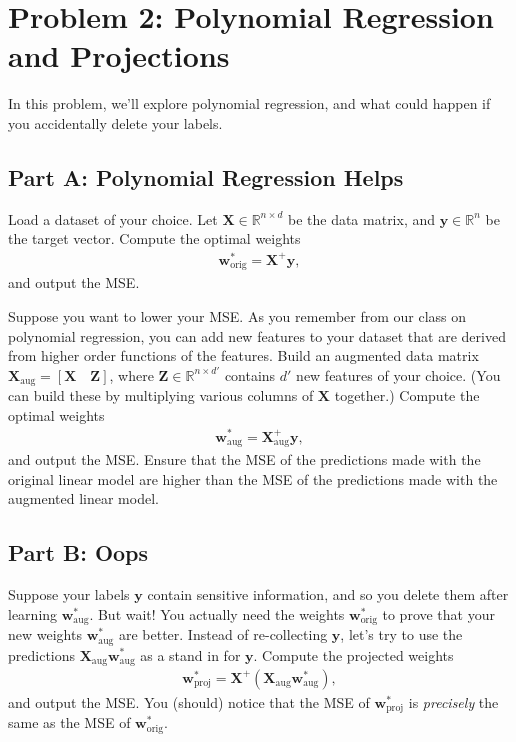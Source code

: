 \documentclass{article}
\begin{document}
%

\newpage
\section*{Problem 2: Polynomial Regression and Projections}

In this problem, we'll explore polynomial regression, and what could happen if you accidentally delete your labels.

\subsection*{Part A: Polynomial Regression Helps}

Load a dataset of your choice.
Let $\mathbf{X} \in \mathbb{R}^{n \times d}$ be the data matrix, and $\mathbf{y} \in \mathbb{R}^n$ be the target vector.
Compute the optimal weights 
\begin{align}
\mathbf{w}^*_\text{orig} = \mathbf{X}^+ \mathbf{y},
\end{align}
and output the MSE.

Suppose you want to lower your MSE.
As you remember from our class on polynomial regression, you can add new features to your dataset that are derived from higher order functions of the features.
Build an augmented data matrix $\mathbf{X}_\text{aug} = [\mathbf{X} \quad \mathbf{Z}]$, where $\mathbf{Z} \in \mathbb{R}^{n \times d'}$ contains $d'$ new features of your choice.
(You can build these by multiplying various columns of $\mathbf{X}$ together.)
Compute the optimal weights
\begin{align}
\mathbf{w}^*_\text{aug} = \mathbf{X}_\text{aug}^+ \mathbf{y},
\end{align}
and output the MSE.
Ensure that the MSE of the predictions made with the original linear model are higher than the MSE of the predictions made with the augmented linear model.

\subsection*{Part B: Oops}

Suppose your labels $\mathbf{y}$ contain sensitive information, and so you delete them after learning $\mathbf{w}^*_\text{aug}$.
But wait!
You actually need the weights $\mathbf{w}^*_\text{orig}$ to prove that your new weights $\mathbf{w}^*_\text{aug}$ are better.
Instead of re-collecting $\mathbf{y}$, let's try to use the predictions $\mathbf{X}_\text{aug} \mathbf{w}^*_\text{aug}$ as a stand in for $\mathbf{y}$.
Compute the projected weights
\begin{align}
\mathbf{w}^*_\text{proj} = \mathbf{X}^+ (\mathbf{X}_\text{aug} \mathbf{w}^*_\text{aug}),
\end{align}
and output the MSE.
You (should) notice that the MSE of $\mathbf{w}^*_\text{proj}$ is \textit{precisely} the same as the MSE of $\mathbf{w}^*_\text{orig}$.
\end{document}
